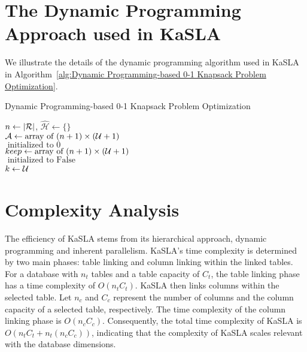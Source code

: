 \section{The Dynamic Programming Approach used in KaSLA}
We illustrate the details of the dynamic programming algorithm used in KaSLA in Algorithm~\ref{alg:Dynamic Programming-based 0-1 Knapsack Problem Optimization}.


\begin{algorithm}[!h]
\caption{Dynamic Programming-based 0-1 Knapsack Problem Optimization}
\label{alg:Dynamic Programming-based 0-1 Knapsack Problem Optimization}
        $n \gets |{\mathcal{R}}|$, $\hat{\mathcal{H}} \gets \{\}$ \\
        $\mathcal{A} \gets \text{array of }(n+1) \times ({\mathcal{U}}+1)$ \\
        $ \text{ initialized to } 0 $\\
        $ keep \gets \text{array of }(n+1) \times ({\mathcal{U}}+1) $\\
        $\text{ initialized to } \text{False}$ \\
        $k \gets {\mathcal{U}}$ \
\end{algorithm}


\section{Complexity Analysis} \label{sec: Complexity Analysis}
The efficiency of KaSLA stems from its hierarchical approach, dynamic programming and inherent parallelism. KaSLA's time complexity is determined by two main phases: table linking and column linking within the linked tables. For a database with \( n_t \) tables and a table capacity of \( C_t \), the table linking phase has a time complexity of \( O(n_t C_t) \). KaSLA then links columns within the selected table. Let \( n_c \) and \( C_c \) represent the number of columns and the column capacity of a selected table, respectively. The time complexity of the column linking phase is \( O(n_c C_c) \). Consequently, the total time complexity of KaSLA is \( O(n_t C_t + n_t(n_c C_c)) \), indicating that the complexity of KaSLA scales relevant with the database dimensions.


